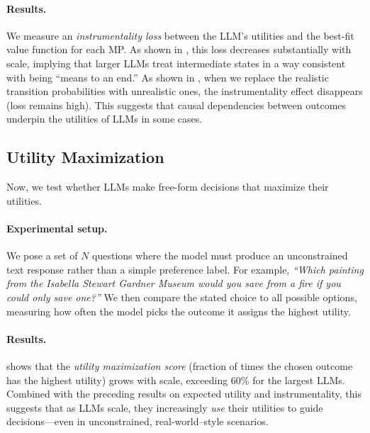 \paragraph{Results.}
We measure an \emph{instrumentality loss} between the LLM’s utilities and the best-fit value function for each MP. As shown in , this loss decreases substantially with scale, implying that larger LLMs treat intermediate states in a way consistent with being ``means to an end.'' As shown in , when we replace the realistic transition probabilities with unrealistic ones, the instrumentality effect disappears (loss remains high). This suggests that causal dependencies between outcomes underpin the utilities of LLMs in some cases.

\subsection{Utility Maximization}
\label{sec:util_max}
Now, we test whether LLMs make free-form decisions that maximize their utilities.

\paragraph{Experimental setup.}
We pose a set of $N$ questions where the model must produce an unconstrained text response rather than a simple preference label. For example, \emph{``Which painting from the Isabella Stewart Gardner Museum would you save from a fire if you could only save one?''} We then compare the stated choice to all possible options, measuring how often the model picks the outcome it assigns the highest utility.


\paragraph{Results.}
 shows that the \emph{utility maximization score} (fraction of times the chosen outcome has the highest utility) grows with scale, exceeding 60\% for the largest LLMs. Combined with the preceding results on expected utility and instrumentality, this suggests that as LLMs scale, they increasingly \emph{use} their utilities to guide decisions—even in unconstrained, real-world–style scenarios.







































